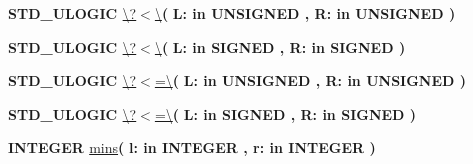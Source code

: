 \begin{DoxyCompactItemize}
\item 
{\bfseries {\bfseries \textcolor{comment}{S\+T\+D\+\_\+\+U\+L\+O\+G\+I\+C}\textcolor{vhdlchar}{ }}} \hyperlink{class__fixed__pkg_abe3172f3a06b21b546baa6a7fc1f29c7}{\textbackslash{}?$<$\textbackslash{}}{\bfseries  ( }{\bfseries \textcolor{vhdlchar}{L\+: }\textcolor{stringliteral}{in }{\bfseries \textcolor{comment}{U\+N\+S\+I\+G\+N\+E\+D}\textcolor{vhdlchar}{ }}}{\bfseries  , \textcolor{vhdlchar}{R\+: }\textcolor{stringliteral}{in }{\bfseries \textcolor{comment}{U\+N\+S\+I\+G\+N\+E\+D}\textcolor{vhdlchar}{ }}}{\bfseries  )} 
\item 
{\bfseries {\bfseries \textcolor{comment}{S\+T\+D\+\_\+\+U\+L\+O\+G\+I\+C}\textcolor{vhdlchar}{ }}} \hyperlink{class__fixed__pkg_abe3172f3a06b21b546baa6a7fc1f29c7}{\textbackslash{}?$<$\textbackslash{}}{\bfseries  ( }{\bfseries \textcolor{vhdlchar}{L\+: }\textcolor{stringliteral}{in }{\bfseries \textcolor{comment}{S\+I\+G\+N\+E\+D}\textcolor{vhdlchar}{ }}}{\bfseries  , \textcolor{vhdlchar}{R\+: }\textcolor{stringliteral}{in }{\bfseries \textcolor{comment}{S\+I\+G\+N\+E\+D}\textcolor{vhdlchar}{ }}}{\bfseries  )} 
\item 
{\bfseries {\bfseries \textcolor{comment}{S\+T\+D\+\_\+\+U\+L\+O\+G\+I\+C}\textcolor{vhdlchar}{ }}} \hyperlink{class__fixed__pkg_a276b77e776712ce9027d7858f46bf7b7}{\textbackslash{}?$<$=\textbackslash{}}{\bfseries  ( }{\bfseries \textcolor{vhdlchar}{L\+: }\textcolor{stringliteral}{in }{\bfseries \textcolor{comment}{U\+N\+S\+I\+G\+N\+E\+D}\textcolor{vhdlchar}{ }}}{\bfseries  , \textcolor{vhdlchar}{R\+: }\textcolor{stringliteral}{in }{\bfseries \textcolor{comment}{U\+N\+S\+I\+G\+N\+E\+D}\textcolor{vhdlchar}{ }}}{\bfseries  )} 
\item 
{\bfseries {\bfseries \textcolor{comment}{S\+T\+D\+\_\+\+U\+L\+O\+G\+I\+C}\textcolor{vhdlchar}{ }}} \hyperlink{class__fixed__pkg_a276b77e776712ce9027d7858f46bf7b7}{\textbackslash{}?$<$=\textbackslash{}}{\bfseries  ( }{\bfseries \textcolor{vhdlchar}{L\+: }\textcolor{stringliteral}{in }{\bfseries \textcolor{comment}{S\+I\+G\+N\+E\+D}\textcolor{vhdlchar}{ }}}{\bfseries  , \textcolor{vhdlchar}{R\+: }\textcolor{stringliteral}{in }{\bfseries \textcolor{comment}{S\+I\+G\+N\+E\+D}\textcolor{vhdlchar}{ }}}{\bfseries  )} 
\item 
{\bfseries {\bfseries \textcolor{comment}{I\+N\+T\+E\+G\+E\+R}\textcolor{vhdlchar}{ }}} \hyperlink{class__fixed__pkg_ad193ba188b936d8f47de5d208d1eb97a}{mins}{\bfseries  ( }{\bfseries \textcolor{vhdlchar}{l\+: }\textcolor{stringliteral}{in }{\bfseries \textcolor{comment}{I\+N\+T\+E\+G\+E\+R}\textcolor{vhdlchar}{ }}}{\bfseries  , \textcolor{vhdlchar}{r\+: }\textcolor{stringliteral}{in }{\bfseries \textcolor{comment}{I\+N\+T\+E\+G\+E\+R}\textcolor{vhdlchar}{ }}}{\bfseries  )} 

\end{DoxyCompactItemize}
